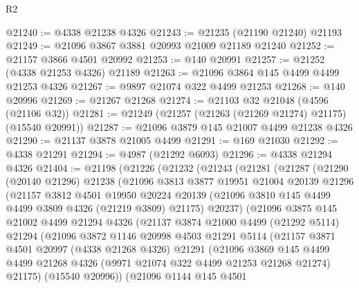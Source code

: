 \begin{lexlean}{R2}
\begin{coremodule}
@21240 := @4338 @21238 @4326
@21243 := @21235 (@21190 @21240) @21193
@21249 := @21096 @3867 @3881 @20993 @21009 @21189 @21240
@21252 := @21157 @3866 @4501 @20992
@21253 := @140 @20991
@21257 := @21252 (@4338 @21253 @4326) @21189
@21263 := @21096 @3864 @145 @4499 @4499 @21253 @4326
@21267 := @9897 @21074 @322 @4499 @21253
@21268 := @140 @20996
@21269 := @21267 @21268
@21274 := @21103 @32 @21048 (@4596 (@21106 @32))
@21281 := @21249 (@21257 (@21263 (@21269 @21274) @21175) (@15540 @20991))
@21287 := @21096 @3879 @145 @21007 @4499 @21238 @4326
@21290 := @21137 @3878 @21005 @4499
@21291 := @169 @21030
@21292 := @4338 @21291
@21294 := @4987 (@21292 @6093)
@21296 := @4338 @21294 @4326
@21404 := @21198
    (@21226
      (@21232
        (@21243
          (@21281
            (@21287
              (@21290
                (@20140 @21296)
                @21238
                (@21096
                  @3813
                  @3877
                  @19951
                  @21004
                  @20139
                  @21296
                  (@21157
                    @3812
                    @4501
                    @19950
                    @20224
                    @20139
                    (@21096 @3810 @145 @4499 @4499 @3809 @4326 (@21219 @3809) @21175)
                    @20237)
                  (@21096
                    @3875
                    @145
                    @21002
                    @4499
                    @21294
                    @4326
                    (@21137
                      @3874
                      @21000
                      @4499
                      (@21292 @5114)
                      @21294
                      (@21096
                        @3872
                        @1146
                        @20998
                        @4503
                        @21291
                        @5114
                        (@21157
                          @3871
                          @4501
                          @20997
                          (@4338 @21268 @4326)
                          @21291
                          (@21096
                            @3869
                            @145
                            @4499
                            @4499
                            @21268
                            @4326
                            (@9971 @21074 @322 @4499 @21253 @21268 @21274)
                            @21175)
                          (@15540 @20996))
                        (@21096
                          @1144
                          @145
                          @4501

\end{coremodule}
\end{lexlean}
